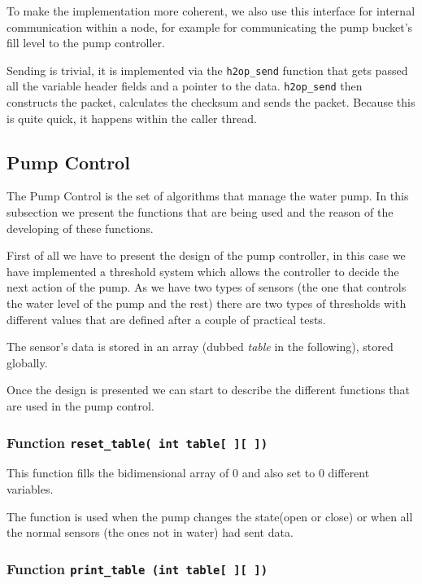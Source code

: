 \documentclass[11pt,paper=a4,parskip=half]{scrartcl}
\begin{document}
To make the implementation more coherent, we also use this interface for
internal communication within a node, for example for communicating the pump
bucket's fill level to the pump controller.


Sending is trivial, it is implemented via the \texttt{h2op\_\allowbreak send}
function that gets passed all the variable header fields and a pointer to the
data. \texttt{h2op\_\allowbreak send} then constructs the packet, calculates
the checksum and sends the packet. Because this is quite quick, it happens
within the caller thread.



\subsection{Pump Control}

The Pump Control is the set of algorithms that manage the water pump.
In this subsection we present the functions that are being used and the reason
of the developing of these functions.

First of all we have to present the design of the pump controller, in this case
we have implemented a threshold system which allows the controller to decide
the next action of the pump. As we have two types of sensors (the one that
controls the water level of the pump and the rest) there are two types of
thresholds with different values that are defined after a couple of practical
tests.

The sensor's data is stored in an array (dubbed \emph{table} in the following), stored globally.

Once the design is presented we can start to describe the different functions
that are used in the pump control.

\subsubsection{Function \texttt{reset\_table( int table[~][~])}}

This function  fills the bidimensional array of 0 and also set to 0 different variables.

The function is used when the pump changes the state(open or close) or when all
the normal sensors (the ones not in water) had sent data.

\subsubsection{Function \texttt{print\_table (int table[~][~])}}
\end{document}

